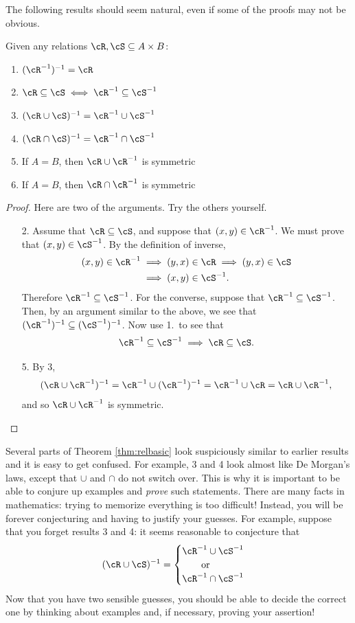\noindent The following results should seem natural, even if some of the proofs may not be obvious.

\begin{thm}\label{thm:relbasic}
Given any relations $\cR,\cS\subseteq A\times B$:
\begin{enumerate}
\item $(\cR^{-1})^{-1}=\cR$
\item $\cR\subseteq \cS\iff \cR^{-1}\subseteq \cS^{-1}$
\item $(\cR\cup \cS)^{-1}=\cR^{-1}\cup \cS^{-1}$
\item $(\cR\cap \cS)^{-1}=\cR^{-1}\cap \cS^{-1}$
\item If $A=B$, then $\cR\cup \cR^{-1}$ is symmetric
\item If $A=B$, then $\cR\cap \cR^{-1}$ is symmetric
\end{enumerate}
\end{thm}

\begin{proof}
Here are two of the arguments. Try the others yourself.
\begin{enumerate}
\item[2.] Assume that $\cR\subseteq\cS$, and suppose that $(x,y)\in\cR^{-1}$. We must prove that $(x,y)\in\cS^{-1}$. By the definition of inverse,
\begin{align*}
(x,y)\in\cR^{-1}&\implies (y,x)\in\cR\implies (y,x)\in\cS\\
&\implies (x,y)\in\cS^{-1}.
\end{align*}
Therefore $\cR^{-1}\subseteq\cS^{-1}$. For the converse, suppose that $\cR^{-1}\subseteq\cS^{-1}$. Then, by an argument similar to the above, we see that $(\cR^{-1})^{-1}\subseteq (\cS^{-1})^{-1}$. Now use 1.\ to see that
\[\cR^{-1}\subseteq\cS^{-1}\implies\cR\subseteq \cS.\]
\item[5.] By 3,
\[(\cR\cup \cR^{-1})^{-1}=\cR^{-1}\cup (\cR^{-1})^{-1}=\cR^{-1}\cup \cR=\cR\cup \cR^{-1},\]
and so $\cR\cup \cR^{-1}$ is symmetric.\qedhere
\end{enumerate}
\end{proof}

\quad Several parts of Theorem \ref{thm:relbasic} look suspiciously similar to earlier results and it is easy to get confused. For example, 3 and 4 look almost like De Morgan's laws, except that $\cup$ and $\cap$ do not switch over. This is why it is important to be able to conjure up examples and \emph{prove} such statements. There are many facts in mathematics: trying to memorize everything is too difficult! Instead, you will be forever conjecturing and having to justify your guesses. For example, suppose that you forget results 3 and 4: it seems reasonable to conjecture that
\[(\cR\cup \cS)^{-1}=\begin{cases}
\cR^{-1}\cup \cS^{-1}\\
\qquad\text{or}\\
\cR^{-1}\cap \cS^{-1}
\end{cases}\]
Now that you have two sensible guesses, you should be able to decide the correct one by thinking about examples and, if necessary, proving your assertion!

